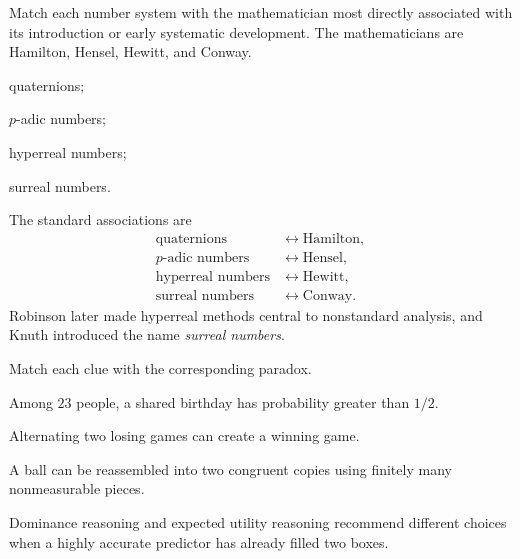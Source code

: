     \begin{expectedproblem}
        Match each number system with the mathematician most directly
        associated with its introduction or early systematic development. The
        mathematicians are Hamilton, Hensel, Hewitt, and Conway.
        \begin{problemchoices}
            \item quaternions;
            \item $p$-adic numbers;
            \item hyperreal numbers;
            \item surreal numbers.
        \end{problemchoices}
    \end{expectedproblem}

    \begin{solution}
        The standard associations are
        \[
            \boxed{
                \begin{aligned}
                    \text{quaternions}
                    &\longleftrightarrow \text{Hamilton},\\
                    p\text{-adic numbers}
                    &\longleftrightarrow \text{Hensel},\\
                    \text{hyperreal numbers}
                    &\longleftrightarrow \text{Hewitt},\\
                    \text{surreal numbers}
                    &\longleftrightarrow \text{Conway}.
                \end{aligned}
            }
        \]
        Robinson later made hyperreal methods central to nonstandard analysis,
        and Knuth introduced the name \emph{surreal numbers}.
    \end{solution}

    \begin{expectedproblem}
        Match each clue with the corresponding paradox.
        \begin{problemsubparts}
            \item Among $23$ people, a shared birthday has probability greater
                  than $1/2$.
            \item Alternating two losing games can create a winning game.
            \item A ball can be reassembled into two congruent copies using
                  finitely many nonmeasurable pieces.
            \item Dominance reasoning and expected utility reasoning recommend
                  different choices when a highly accurate predictor has already
                  filled two boxes.
        \end{problemsubparts}
    \end{expectedproblem}

